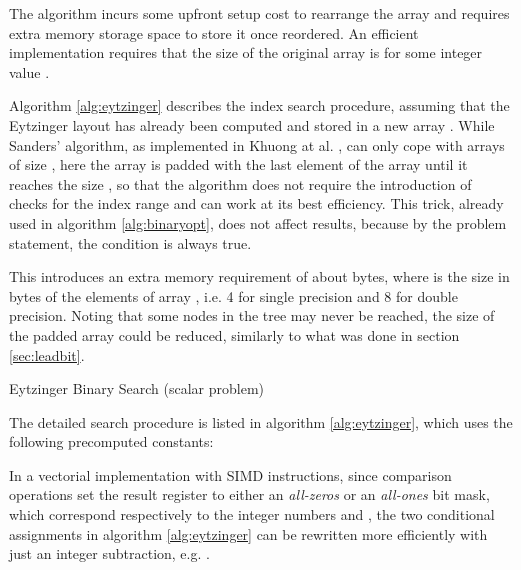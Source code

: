 \documentclass[preprint,1p,times]{elsarticle}
\begin{document}
The algorithm incurs some upfront setup cost to rearrange the array  and requires extra memory storage space to store it once reordered. An efficient implementation requires that the size of the original array  is  for some integer value . 

Algorithm \ref{alg:eytzinger} describes the index search procedure, assuming that the Eytzinger layout has already been computed and stored in a new array . 
While Sanders' algorithm, as implemented in Khuong at al. \cite{Morin2015}, can only cope with arrays of size , here the array  is padded with the last element of the array  until it reaches the size , so that the algorithm does not require the introduction of checks for the index range and can work at its best efficiency. This trick, already used in algorithm \ref{alg:binaryopt}, does not affect results, because by the problem statement, the condition  is always true.

This introduces an extra memory requirement of about  bytes, where  is the size in bytes of the elements of array , i.e. 4 for single precision and 8 for double precision. Noting that some nodes in the tree may never be reached, the size of the padded array  could be reduced, similarly to what was done in section \ref{sec:leadbit}.

\begin{algorithm}[ht]
	\caption{Eytzinger Binary Search (scalar problem)}
	\label{alg:eytzinger}
	\begin{algorithmic}
		\Function {\EytzingerName}{\fin , , , , \fout } 
		\State {}
		\If {}
		\State {}  
		\EndIf
		\While {}
		\State {}
		\If {}
		\State {}  
		\EndIf
		\State {}
		\State {}
		\EndWhile
		
		\State {} 
		
		\EndFunction
	\end{algorithmic}
\end{algorithm}

The detailed search procedure is listed in algorithm \ref{alg:eytzinger}, which uses the following precomputed constants:


In a vectorial implementation with SIMD instructions, since comparison operations set the result register to either an \textit{all-zeros} or an \textit{all-ones} bit mask, which correspond respectively to the integer numbers  and , the two conditional assignments in algorithm \ref{alg:eytzinger} can be rewritten more efficiently with just an integer subtraction, e.g. .
\end{document}
